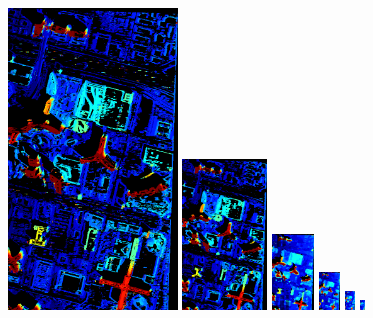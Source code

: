 \documentclass{article}
\theoremstyle{definition}
\begin{document}
\begin{figure}[th]
  \centering
  \includegraphics[width=0.4\textwidth]{images/pyr/1522269722500_pyr_depth_000.png}
  \includegraphics[width=0.2\textwidth]{images/pyr/1522269722500_pyr_depth_001.png}
  \includegraphics[width=0.1\textwidth]{images/pyr/1522269722500_pyr_depth_002.png}
  \includegraphics[width=0.05\textwidth]{images/pyr/1522269722500_pyr_depth_003.png}
  \includegraphics[width=0.025\textwidth]{images/pyr/1522269722500_pyr_depth_004.png}
  \includegraphics[width=0.0125\textwidth]{images/pyr/1522269722500_pyr_depth_005.png} \\

\end{figure}
\end{document}
